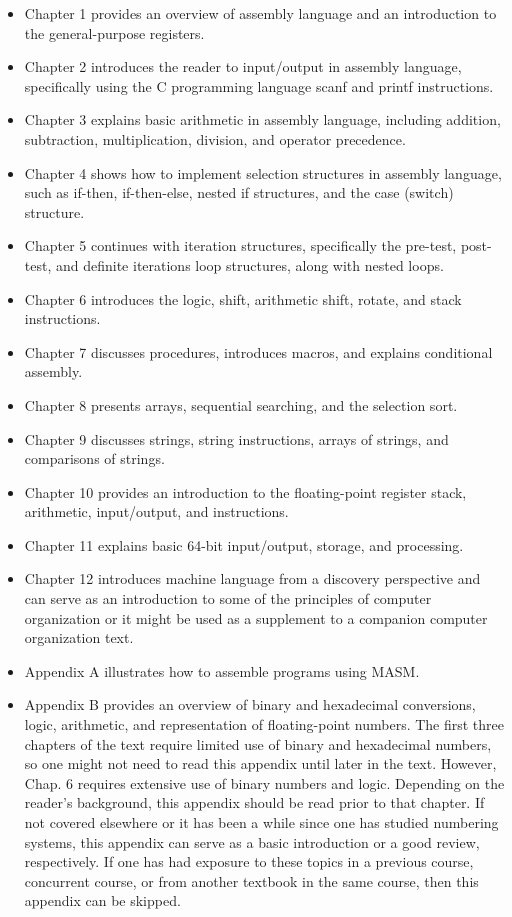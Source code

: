 \documentclass[10pt]{book}
\begin{document}
\begin{itemize}
  \item Chapter 1 provides an overview of assembly language and an introduction to the general-purpose registers.
  \item Chapter 2 introduces the reader to input/output in assembly language, specifically using the C programming language scanf and printf instructions.
  \item Chapter 3 explains basic arithmetic in assembly language, including addition, subtraction, multiplication, division, and operator precedence.
  \item Chapter 4 shows how to implement selection structures in assembly language, such as if-then, if-then-else, nested if structures, and the case (switch) structure.
  \item Chapter 5 continues with iteration structures, specifically the pre-test, post-test, and definite iterations loop structures, along with nested loops.
  \item Chapter 6 introduces the logic, shift, arithmetic shift, rotate, and stack instructions.
  \item Chapter 7 discusses procedures, introduces macros, and explains conditional assembly.
  \item Chapter 8 presents arrays, sequential searching, and the selection sort.
  \item Chapter 9 discusses strings, string instructions, arrays of strings, and comparisons of strings.
  \item Chapter 10 provides an introduction to the floating-point register stack, arithmetic, input/output, and instructions.
  \item Chapter 11 explains basic 64-bit input/output, storage, and processing.
  \item Chapter 12 introduces machine language from a discovery perspective and can serve as an introduction to some of the principles of computer organization or it might be used as a supplement to a companion computer organization text.
  \item Appendix A illustrates how to assemble programs using MASM.
  \item Appendix B provides an overview of binary and hexadecimal conversions, logic, arithmetic, and representation of floating-point numbers. The first three chapters of the text require limited use of binary and hexadecimal numbers, so one might not need to read this appendix until later in the text. However, Chap. 6 requires extensive use of binary numbers and logic. Depending on the reader's background, this appendix should be read prior to that chapter. If not covered elsewhere or it has been a while since one has studied numbering systems, this appendix can serve as a basic introduction or a good review, respectively. If one has had exposure to these topics in a previous course, concurrent course, or from another textbook in the same course, then this appendix can be skipped.

\end{itemize}
\end{document}
